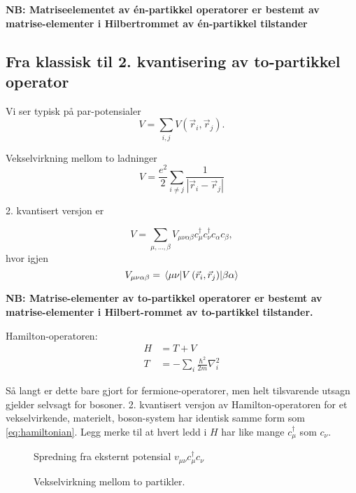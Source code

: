 \textbf{NB: Matriseelementet av én-partikkel operatorer er bestemt av matrise-elementer i Hilbertrommet av én-partikkel tilstander}

\subsection{Fra klassisk til 2. kvantisering av to-partikkel operator}

Vi ser typisk på par-potensialer 
\begin{equation}
V = \sum_{i, j} V\left(\vec{r}_i, \vec{r}_j\right).
\end{equation}

\begin{theorem}
Vekselvirkning mellom to ladninger
\begin{equation}
V = \frac{e^2}{2}\sum_{i\ne j} \frac{1}{|\vec{r}_i - \vec{r}_j|}
\end{equation}
\end{theorem}

2. kvantisert versjon er

\begin{equation}
V = \sum_{\mu, \dots, \beta} V_{\mu\nu\alpha\beta}c_{\mu}^\dagger c_{\nu}^\dagger c_{\alpha}c_{\beta},
\end{equation}
hvor igjen
\begin{equation}
V_{\mu\nu\alpha\beta} = \mel{\mu\nu}{V\left(\vec{r}_i, \vec{r}_j\right)}{\beta\alpha}
\end{equation}

\textbf{NB: Matrise-elementer av to-partikkel operatorer er bestemt av matrise-elementer i Hilbert-rommet av to-partikkel tilstander.}

Hamilton-operatoren:
\begin{align}
H &= T + V \label{eq:hamiltonian} \\
T &= -\sum_i \frac{\hbar^2}{2m}\nabla_i^2
\end{align}

Så langt er dette bare gjort for fermione-operatorer, men helt tilsvarende utsagn gjelder selvsagt for bosoner. 2. kvantisert versjon av Hamilton-operatoren for et vekselvirkende, materielt, boson-system har identisk samme form som \ref{eq:hamiltonian}. Legg merke til at hvert ledd i $H$ har like mange $c_\mu^\dagger$ som $c_{\nu}$.


\begin{figure}
\centering

\caption{Spredning fra eksternt potensial $v_{\mu\nu}c_{\mu}^\dagger c_{\nu}$}
\end{figure}


\begin{figure}
\centering

\caption{Vekselvirkning mellom to partikler.}
\end{figure}